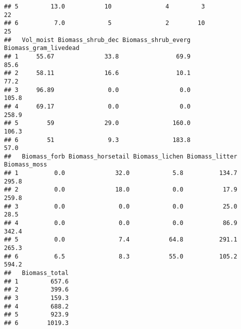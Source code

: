 \documentclass[
]{article}
\begin{document}
\begin{verbatim}
## 5         13.0           10               4         3               22
## 6          7.0            5               2        10               25
##   Vol_moist Biomass_shrub_dec Biomass_shrub_everg Biomass_gram_livedead
## 1     55.67              33.8                69.9                  85.6
## 2     58.11              16.6                10.1                  77.2
## 3     96.89               0.0                 0.0                 105.8
## 4     69.17               0.0                 0.0                 258.9
## 5        59              29.0               160.0                 106.3
## 6        51               9.3               183.8                  57.0
##   Biomass_forb Biomass_horsetail Biomass_lichen Biomass_litter Biomass_moss
## 1          0.0              32.0            5.8          134.7        295.8
## 2          0.0              18.0            0.0           17.9        259.8
## 3          0.0               0.0            0.0           25.0         28.5
## 4          0.0               0.0            0.0           86.9        342.4
## 5          0.0               7.4           64.8          291.1        265.3
## 6          6.5               8.3           55.0          105.2        594.2
##   Biomass_total
## 1         657.6
## 2         399.6
## 3         159.3
## 4         688.2
## 5         923.9
## 6        1019.3
\end{verbatim}
\end{document}
